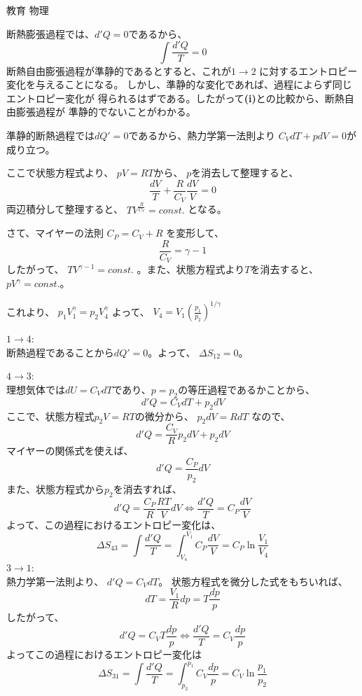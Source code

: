 \documentclass[fleqn]{jbook}
\begin{document}
\begin{answer}{教育 物理}{}
\begin{subanswers}
\begin{subsubanswers}
\SubSubAnswer

断熱膨張過程では、$d'Q=0$であるから、
\[
\int\frac{d'Q}{T} = 0
\]
断熱自由膨張過程が準静的であるとすると、これが$1 \rightarrow 2$
に対するエントロピー変化を与えることになる。
しかし、準静的な変化であれば、過程によらず同じエントロピー変化が
得られるはずである。したがって{\bf{(i)}}との比較から、断熱自由膨張過程が
準静的でないことがわかる。

\SubSubAnswer
準静的断熱過程では$dQ'=0$であるから、熱力学第一法則より
$\displaystyle{
C_{V}dT + pdV = 0
}$が成り立つ。

ここで状態方程式より、
$\displaystyle{
pV =RT
}$から、
$p$を消去して整理すると、
\[
\frac{dV}{T} + \frac{R}{C_{V}}\frac{dV}{V} = 0
\]
両辺積分して整理すると、
$\displaystyle{
TV^{\frac{R}{C_{V}}} = const.
}$
となる。

さて、マイヤーの法則
$\displaystyle{
C_{P} = C_{V} + R
}$
を変形して、
\[
\frac{R}{C_{V}} = \gamma -1
\]
したがって、
$\displaystyle{
TV^{\gamma -1} = const.
}$
。また、状態方程式より$T$を消去すると、
$\displaystyle{
pV^{\gamma}=const.
}$。

これより、
$\displaystyle{
p_{1}V_{1}^{\gamma} = p_{2}V_{4}^{\gamma}
}$
よって、
$\displaystyle{
V_{4} = V_{1} \left( \frac{p_{1}}{p_{2}} \right)^{1/\gamma}
}$

\SubSubAnswer
$1 \rightarrow 4$:\\
断熱過程であることから$dQ'=0$。よって、
$
\Delta S_{12} = 0
$。

$4 \rightarrow 3$:\\
理想気体では$dU = C_{V}dT$であり、$p=p_{2}$の等圧過程であるかことから、
\[
d'Q = C_{V}dT + p_{2}dV
\]
ここで、状態方程式$p_{2}V=RT$の微分から、
$
p_{2}dV = RdT
$
なので、
\[
d'Q = \frac{C_{V}}{R}p_{2}dV + p_{2}dV
\]
マイヤーの関係式を使えば、
\[
d'Q = \frac{C_{P}}{p_{2}}dV
\]
また、状態方程式から$p_{2}$を消去すれば、
\[
d'Q = \frac{C_{P}}{R}\frac{RT}{V}dV
\Longleftrightarrow 
\frac{d'Q}{T} = C_{P}\frac{dV}{V}
\]
よって、この過程におけるエントロピー変化は、
\[
\Delta S_{43} =  \int\frac{d'Q}{T} 
              =  \int_{V_{4}}^{V_{1}}C_{P}\frac{dV}{V}
              =   C_{P}\ln\frac{V_{1}}{V_{4}}
\]
$3 \rightarrow 1$:\\
熱力学第一法則より、
$\displaystyle{
d'Q = C_{V} dT
}$。
状態方程式を微分した式をもちいれば、
\[
dT = \frac{V_{1}}{R}dp = T\frac{dp}{p}
\]
したがって、
\[
d'Q = C_{V}T\frac{dp}{p}
\Longleftrightarrow 
\frac{d'Q}{T} = C_{V}\frac{dp}{p}
\]
よってこの過程におけるエントロピー変化は
\[
\Delta S_{31} =  \int\frac{d'Q}{T}
              =  \int_{p_{2}}^{p_{1}}C_{V}\frac{dp}{p}
              =   C_{V}\ln\frac{p_{1}}{p_{2}}
\]


\end{subsubanswers}
\end{subanswers}
\end{answer}
\end{document}
